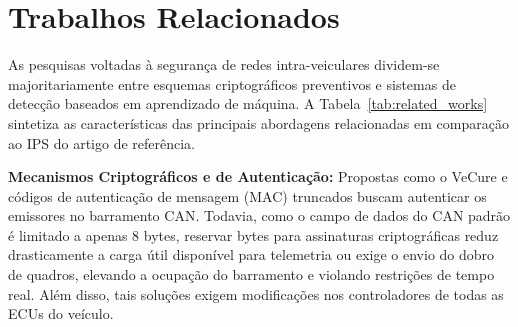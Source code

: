 \documentclass[conference]{IEEEtran}
\begin{document}
\section{Trabalhos Relacionados}

As pesquisas voltadas à segurança de redes intra-veiculares dividem-se majoritariamente entre esquemas criptográficos preventivos e sistemas de detecção baseados em aprendizado de máquina. A Tabela~\ref{tab:related_works} sintetiza as características das principais abordagens relacionadas em comparação ao IPS do artigo de referência.

\begin{table}[htbp]
\caption{Comparação entre Trabalhos Relacionados na Literatura}
\label{tab:related_works}
\centering
{}
\end{table}

\textbf{Mecanismos Criptográficos e de Autenticação:} Propostas como o VeCure e códigos de autenticação de mensagem (MAC) truncados \cite{wang2018hardware} buscam autenticar os emissores no barramento CAN. Todavia, como o campo de dados do CAN padrão é limitado a apenas 8 bytes, reservar bytes para assinaturas criptográficas reduz drasticamente a carga útil disponível para telemetria ou exige o envio do dobro de quadros, elevando a ocupação do barramento e violando restrições de tempo real. Além disso, tais soluções exigem modificações nos controladores de todas as ECUs do veículo.
\end{document}
